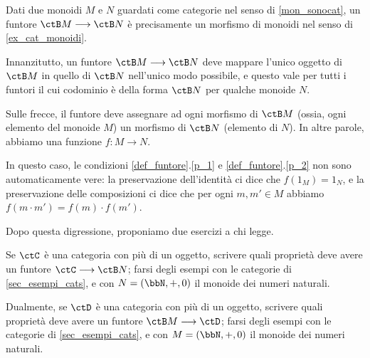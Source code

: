 \begin{example}\label{exa_funtori_da_gruppi}
	Dati due monoidi \(M\) e \(N\) guardati come categorie nel senso di \ref{mon_sonocat}, un funtore \(\ctB M\fun \ctB N\) è precisamente un morfismo di monoidi nel senso di \ref{ex_cat_monoidi}.

	Innanzitutto, un funtore \(\ctB M\fun \ctB N\) deve mappare l'unico oggetto di \(\ctB M\) in quello di \(\ctB N\) nell'unico modo possibile, e questo vale per tutti i funtori il cui codominio è della forma \(\ctB N\) per qualche monoide \(N\).

	Sulle frecce, il funtore deve assegnare ad ogni morfismo di \(\ctB M\) (ossia, ogni elemento del monoide \(M\)) un morfismo di \(\ctB N\) (elemento di \(N\)). In altre parole, abbiamo una funzione \(f:M\to N\).

	In questo caso, le condizioni \ref{def_funtore}.\ref{p_1} e \ref{def_funtore}.\ref{p_2} non sono automaticamente vere: la preservazione dell'identità ci dice che \(f(1_M)=1_N\), e la preservazione delle composizioni ci dice che per ogni \(m,m'\in M\) abbiamo \(f(m\cdot m')=f(m)\cdot f(m')\).
\end{example}
\begin{remark}
\end{remark}
Dopo questa digressione, proponiamo due esercizi a chi legge.

Se \(\ctC\) è una categoria con più di un oggetto, scrivere quali proprietà deve avere un funtore \(\ctC \fun \ctB N\); farsi degli esempi con le categorie di \ref{sec_esempi_cats}, e con \(N=(\bbN,+,0)\) il monoide dei numeri naturali.

Dualmente, se \(\ctD\) è una categoria con più di un oggetto, scrivere quali proprietà deve avere un funtore \(\ctB M \fun \ctD\); farsi degli esempi con le categorie di \ref{sec_esempi_cats}, e con \(M = (\bbN,+,0)\) il monoide dei numeri naturali.

